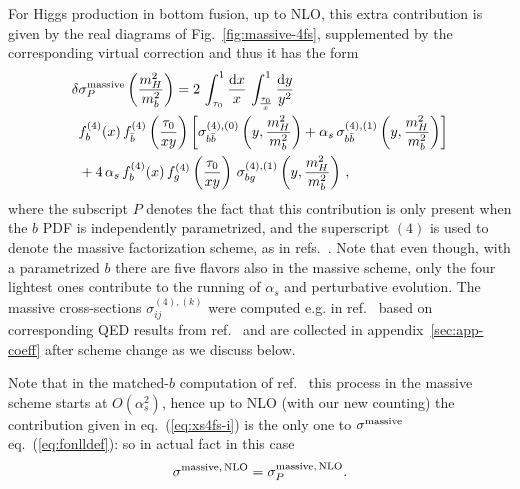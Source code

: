 For Higgs production in bottom fusion, up to NLO, this extra
contribution is given by
the real diagrams of Fig.~\ref{fig:massive-4fs}, supplemented
by the corresponding virtual correction and thus it
has the form
\begin{equation}
  \label{eq:xs4fs-i}
  \begin{split}
    \delta&\sigma_P^{\rm massive}\left(\frac{m_H^2}{m_b^2}\right) = 
    2\,\int_{\tau_0}^1 \frac{{\rm d}{x}}{x}\,
    \int_{\frac{\tau_0}{x}}^1 \frac{{\rm d}{y}}{y^2}\, \\
    &f^{(4)}_b(x)\,f^{(4)}_{\bar{b}}\left(\frac{\tau_0}{xy}\right)
    \biggl[\sigma_{b\bar{b}}^{(4),(0)}\left(y,\frac{m_H^2}{m_b^2}\right) +
      \alpha_s\,\sigma_{b\bar{b}}^{(4),(1)}\left(y,\frac{m_H^2}{m_b^2}\right)
    \biggr]\\
    &
    +
    4\,\alpha_s\,f^{(4)}_b(x)\,f^{(4)}_g\left(\frac{\tau_0}{xy}\right)\,
    \sigma_{bg}^{(4),(1)}\left(y,\frac{m_H^2}{m_b^2}\right)\,,
  \end{split}
\end{equation}
where the subscript $P$ denotes the fact that this contribution is
only present when the $b$ PDF is independently parametrized, and the
superscript $(4)$ is used to denote the massive factorization scheme,
as in refs.~\cite{Forte:2015hba,Forte:2016sja}. Note that even though,
with a parametrized $b$ there are five flavors also in
the massive scheme, only the four lightest ones contribute to
the running of $\alpha_s$ and perturbative evolution. The
massive cross-sections $\sigma_{ij}^{(4),(k)}$ were computed e.g. in
ref.~\cite{Krauss:2017wmx} based on corresponding QED results from
ref.~\cite{Dittmaier:1999mb} and are collected in
appendix~\ref{sec:app-coeff} after scheme change as we discuss below.

Note that in the matched-$b$ computation
of ref.~\cite{Forte:2015hba,Forte:2016sja} this
process  in the massive scheme starts at $O(\alpha_s^2)$, hence up to NLO (with our new
counting) the contribution given in eq.~(\ref{eq:xs4fs-i}) is the only
one to $\sigma^{\rm massive}$ eq.~(\ref{eq:fonlldef}): so in actual fact
in this case
\begin{equation}
   \sigma^{\rm massive,\,NLO}= \sigma^{\rm massive,\,NLO}_{P}.
\end{equation}

